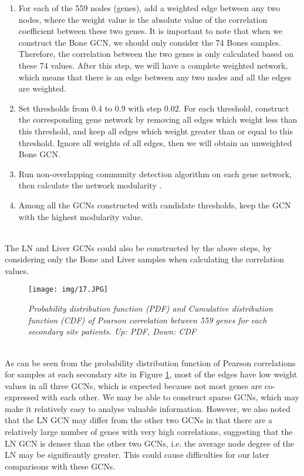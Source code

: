 \documentclass[12pt,a4paper]{report}
\begin{document}
\begin{enumerate}[\hspace{3em}a.]
\item For each of the 559 nodes (genes), add a weighted edge between any two nodes, where the weight value is the absolute value of the correlation coefficient between these two genes. It is important to note that when we construct the Bone GCN, we should only consider the 74 Bones samples. Therefore, the correlation between the two genes is only calculated based on these 74 values. After this step, we will have a complete weighted network, which means that there is an edge between any two nodes and all the edges are weighted.  

\item Set thresholds from 0.4 to 0.9 with step 0.02. For each threshold, construct the corresponding gene network by removing all edges which weight less than this threshold, and keep all edges which weight greater than or equal to this threshold. Ignore all weights of all edges, then we will obtain an unweighted Bone GCN.

\item Run non-overlapping community detection algorithm on each gene network, then calculate the network modularity \cite{New06}.

\item Among all the GCNs constructed with candidate thresholds, keep the GCN with the highest modularity value.
\end{enumerate}\\

The LN and Liver GCNs could also be constructed by the above steps, by considering only the Bone and Liver samples when calculating the correlation values. \\



\begin{figure}[h!]
\centering
\texttt{[image: img/17.JPG]}
\caption{\textit{Probability distribution function (PDF) and Cumulative distribution function (CDF) of Pearson correlation between 559 genes for each secondary site patients. Up: PDF, Down: CDF}}
\label{fig:corrpdfcdf}
\end{figure}\\


As can be seen from the probability distribution function of Pearson correlations for samples at each secondary site in Figure \ref{fig:corrpdfcdf}, most of the edges have low weight values in all three GCNs, which is expected because not most genes are co-expressed with each other. We may be able to construct sparse GCNs, which may make it relatively easy to analyse valuable information. However, we also noted that the LN GCN may differ from the other two GCNs in that there are a relatively large number of genes with very high correlations, suggesting that the LN GCN is denser than the other two GCNs, i.e. the average node degree of the LN may be significantly greater. This could cause difficulties for our later comparisons with these GCNs.\\
\end{document}
